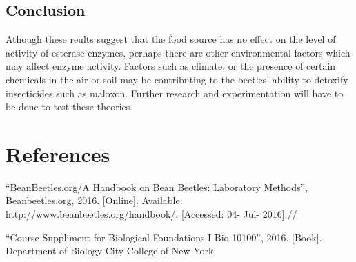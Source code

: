 \documentclass[12pt]{article}
\begin{document}
\subsection{Conclusion}
Athough these reults suggest that the food source has no effect on the level of activity of esterase enzymes, perhaps there are other environmental factors which may affect enzyme activity. Factors such as climate, or the presence of certain chemicals in the air or soil may be contributing to the beetles' ability to detoxify insecticides such as maloxon. Further research and experimentation will have to be done to test these theories.

\section{References}
\noindent[1] ``BeanBeetles.org/A Handbook on Bean Beetles: Laboratory Methods'', Beanbeetles.org, 2016. [Online]. Available: \url{http://www.beanbeetles.org/handbook/}. [Accessed: 04- Jul- 2016].//

\noindent[2] ``Course Suppliment for Biological Foundations I Bio 10100'', 2016. [Book]. Department of Biology City College of New York
\end{document}
